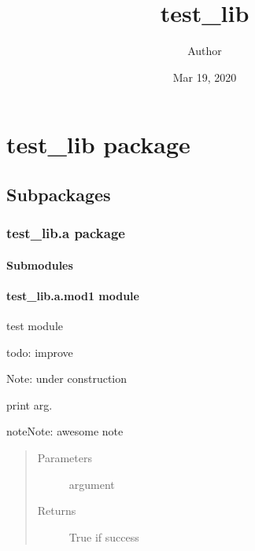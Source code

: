 \documentclass[letterpaper,10pt,dvipdfmx]{sphinxmanual}
\title{test\_lib}
\date{Mar 19, 2020}
\author{Author}
\begin{document}
\pagestyle{empty}
\sphinxmaketitle
\pagestyle{plain}
\sphinxtableofcontents
\pagestyle{normal}
\label{\detokenize{index::doc}}



\chapter{test\_lib package}
\label{\detokenize{test_lib:test-lib-package}}\label{\detokenize{test_lib::doc}}

\section{Subpackages}
\label{\detokenize{test_lib:subpackages}}

\subsection{test\_lib.a package}
\label{\detokenize{test_lib.a:test-lib-a-package}}\label{\detokenize{test_lib.a::doc}}

\subsubsection{Submodules}
\label{\detokenize{test_lib.a:submodules}}

\subsubsection{test\_lib.a.mod1 module}
\label{\detokenize{test_lib.a:module-test_lib.a.mod1}}\label{\detokenize{test_lib.a:test-lib-a-mod1-module}}
test module

todo: improve

Note: under construction

\begin{fulllineitems}
\label{\detokenize{test_lib.a:test_lib.a.mod1.func1}}
print arg.

\begin{sphinxadmonition}{note}{Note:}
awesome note
\end{sphinxadmonition}
\begin{quote}\begin{description}
\item[{Parameters}] \leavevmode
{} \sphinxhyphen{}\sphinxhyphen{} argument

\item[{Returns}] \leavevmode
True if success

\end{description}\end{quote}

\end{fulllineitems}
\end{document}
